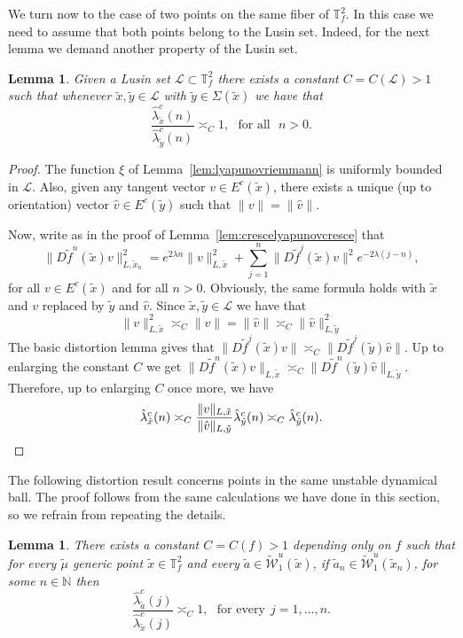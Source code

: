 \documentclass[a4paper,11pt,reqno]{amsart}
\newcommand{\N}{{\mathbb N}}
\newcommand{\TTf}{{\mathbb{T}_f^2}}
\newcommand{\cL}{{\mathcal L}}
\newcommand{\cW}{{\mathcal W}}
\newcommand{\tix}{\tilde{x}}
\newcommand{\tif}{\tilde{f}}
\newcommand{\w}{\widetilde{\cW}}
\newtheorem{lemma}[theorem]{Lemma}
\theoremstyle{definition}
\begin{document}
We turn now to the case of two points on the same fiber of $\TTf$. In this case we need to assume that both points belong to the Lusin set. Indeed, for the next lemma we demand another property of the Lusin set. %

\begin{lemma}
    \label{lem:distlusinnasfibras}
    Given a Lusin set $\cL\subset\TTf$ there exists a constant $C=C(\cL)>1$ such that whenever $\tix,\tilde{y}\in\cL$ with $\tilde{y}\in\Sigma(\tix)$ we have that 
    \[
    \frac{\hat{\lambda}^c_{\tix}(n)}{\hat{\lambda}^c_{\tilde{y}}(n)}\asymp_C1,\:\:\:\textrm{for all}\:\:\:n>0.
    \]
\end{lemma}
\begin{proof}
    The function $\xi$ of Lemma~\ref{lem:lyapunovriemmann} is uniformly bounded in $\cL$. Also, given any tangent vector $v\in E^c(\tix)$, there exists a unique (up to orientation) vector $\hat{v}\in E^c(\tilde{y})$ such that $\|v\|=\|\hat{v}\|$. 

    Now, write as in the proof of Lemma~\ref{lem:crescelyapunovcresce} that
    \[
    \|D\tif^n(\tix)v\|^2_{L,\tix_n}=e^{2\lambda n}\|v\|^2_{L,\tix}+\sum_{j=1}^n\|D\tif^j(\tix)v\|^2e^{-2\lambda(j-n)},
    \]
    for all $v\in E^c(\tix)$ and for all $n>0$. Obviously, the same formula holds with $\tix$ and $v$ replaced by $\tilde{y}$ and $\hat{v}$. Since $\tix,\tilde{y}\in\cL$ we have that 
    \[
    \|v\|^2_{L,\tix}\asymp_C\|v\|=\|\hat{v}\|\asymp_C\|\hat{v}\|^2_{L,\tilde{y}}
    \]
    The basic distortion lemma gives that $\|D\tilde{f}^j(\tix)v\|\asymp_C\|D\tif^j(\tilde{y})\hat{v}\|$. Up to enlarging the constant $C$ we get $\|D\tif^n(\tix)v\|_{L,\tix}\asymp_C\|D\tif^n(\tilde{y})\hat{v}\|_{L,\tilde{y}}$.  Therefore, up to enlarging $C$ once more, we have
    \[
    \hat{\lambda}^c_{\tix}(n)\asymp_C\frac{\|v\|_{L,\tix}}{\|\hat{v}\|_{L,\tilde{y}}}{\hat{\lambda}^c_{\tilde{y}}(n)}\asymp_C\hat{\lambda}^c_{\tilde{y}}(n). \qedhere
    \]
\end{proof}

The following distortion result concerns points in the same unstable dynamical ball. The proof follows from the same calculations we have done in this section, so we refrain from repeating the details.

\begin{lemma}
    \label{lem:distodynball}
There exists a constant $C=C(f)>1$ depending only on $f$ such that for every $\tilde{\mu}$ generic point $\tix\in\TTf$ and every $\tilde{a}\in\w^u_1(\tilde{x})$, if $\tilde{a}_n\in\w^u_1(\tix_n)$, for some $n\in\N$ then 
\[
\frac{\hat{\lambda}^c_{\tilde{a}}(j)}{\hat{\lambda}^c_{\tilde{x}}(j)}\asymp_C 1,\:\:\:\textrm{for every}\:\:j=1,\dots,n.
\]
\end{lemma}
\end{document}
